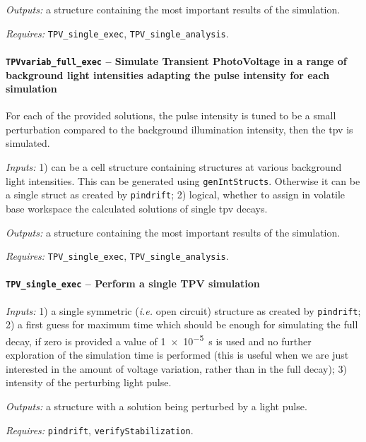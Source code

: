 		\textit{Outputs:} a structure containing the most important results of the simulation.
		
		\textit{Requires:} \texttt{TPV\_single\_exec}, \texttt{TPV\_single\_analysis}.
		
		
		
				\paragraph{\texttt{TPV\-variab\_full\_exec} -- Simulate Transient PhotoVoltage in a range of background light intensities adapting the pulse intensity for each simulation}
				For each of the provided solutions, the pulse intensity is tuned to be a small perturbation compared to the background illumination intensity, then the \gls{tpv} is simulated.
				
				\textit{Inputs:} 1) can be a cell structure containing structures at various background
				light intensities. This can be generated using \texttt{gen\-Int\-Structs}.
				Otherwise it can be a single struct as created by \texttt{pin\-drift};
				2) logical, whether to assign in volatile base
				workspace the calculated solutions of single \gls{tpv} decays.
				
				\textit{Outputs:} a structure containing the most important results of the simulation.
				
				\textit{Requires:} \texttt{TPV\_single\_exec}, \texttt{TPV\_single\_analysis}.
		
		
		\paragraph{\texttt{TPV\_single\_exec} -- Perform a single TPV simulation}
		
		\textit{Inputs:} 1) a single symmetric (\textsl{i.e.} open circuit) structure as created by \texttt{pin\-drift};
		2) a first guess for maximum time which should be enough for simulating the full decay, if zero is provided a value of \SI{1e-5}{\s} is used and no further exploration of the simulation time is performed (this is useful when we are just interested in the amount of voltage variation, rather than in the full decay);
		3) intensity of the perturbing light pulse.
		
		\textit{Outputs:} a structure with a solution being perturbed by a light pulse.
		
		\textit{Requires:} \texttt{pin\-drift}, \texttt{verify\-Stabilization}.
		
